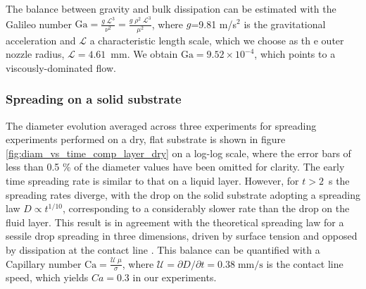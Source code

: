 \documentclass[aip,graphicx]{revtex4-1}
\newcommand{\sym}[1]{\text{#1}}
\begin{document}
The balance between gravity and bulk dissipation can be estimated with the Galileo number $\displaystyle \sym{Ga} = \frac{g \; \mathcal{L}^3}{\nu^2} = \frac{g \; \rho^2 \; \mathcal{L}^3}{\mu^2}$, where $g$=9.81 m/s$^2$ is the gravitational acceleration and $\mathcal{L}$ a characteristic length scale, which we choose as th e outer nozzle radius, $\mathcal{L}=4.61$~mm.  We obtain 
$\sym{Ga}=9.52 \times 10^{-4}$, which points to a viscously-dominated flow.

\subsubsection{Spreading on a solid substrate}

The diameter evolution averaged across three experiments for spreading experiments performed on a dry, flat substrate is shown in figure \ref{fig:diam_vs_time_comp_layer_dry} on a log-log scale, where the error bars of less than 0.5 \% of the diameter values have been omitted for clarity. The early time spreading rate is similar to that on a liquid layer. However, for $t > 2$~s the spreading rates diverge, with the drop on the solid substrate adopting a spreading law $D \propto t^{1/10}$, corresponding to a considerably slower rate than the drop on the fluid layer. This result is in agreement with the theoretical spreading law for a sessile drop spreading in three dimensions, driven by surface tension and opposed by dissipation at the contact line \cite{bonn2009wetting, cazabat1986dynamics}.
This balance can be quantified with a Capillary number $\displaystyle \sym{Ca} = \frac{\mathcal{U} \; \mu}{\sigma}$,  where $\mathcal{U}=\partial D/ \partial t=0.38 \; \sym{mm/s}$  is the contact line speed, which yields $Ca=0.3$ in our experiments.

%
\end{document}
